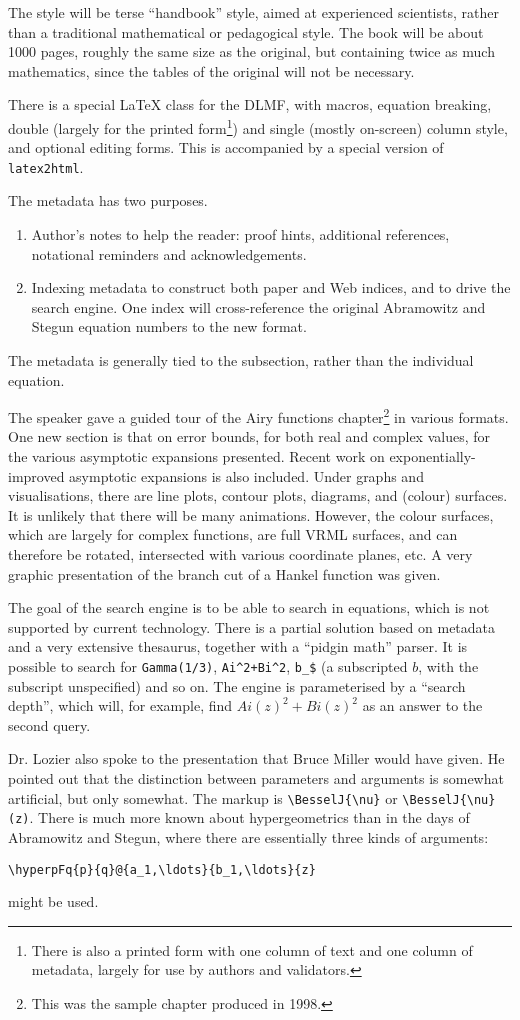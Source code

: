 \documentclass[11pt, a4paper]{article}
\begin{document}
The style will be terse ``handbook'' style, aimed at experienced scientists,
rather than a traditional mathematical or pedagogical style. The book will
be about 1000 pages, roughly the same size as the original, but containing
twice as much mathematics, since the tables of the original will not be
necessary.
\par
There is a special \LaTeX{} class for the DLMF, with macros, equation
breaking, double (largely for the printed form\footnote{There is also a
printed form with one column of text and one column of metadata, largely
for use by authors and validators.}) and single (mostly
on-screen) column style, and optional editing forms. This is accompanied by
a special version of \verb+latex2html+.
\par
The metadata has two purposes.
\begin{enumerate}
\item Author's notes to help the reader: proof hints, additional
references, notational reminders and acknowledgements.
\item Indexing metadata to construct both paper and Web indices, and to
drive the search engine. One index will cross-reference the original
Abramowitz and Stegun equation numbers to the new format.
\end{enumerate}
The metadata is generally tied to the subsection, rather than the
individual equation.
\par
The speaker gave a guided tour of the Airy functions chapter\footnote{This
was the sample chapter produced in 1998.} in various
formats.  One new section is that on error bounds, for both real and
complex values, for the various asymptotic expansions presented. Recent
work on exponentially-improved asymptotic expansions is also included.
Under graphs and visualisations, there are line plots, contour plots,
diagrams, and (colour) surfaces. It is unlikely that there will be many
animations. However, the colour surfaces, which are largely for complex
functions, are full VRML surfaces, and can therefore be rotated,
intersected with various coordinate planes, etc. A very graphic
presentation of the branch cut of a Hankel function was given.
\par
The goal of the search engine is to be able to search in equations, which
is not supported by current technology. There is a partial solution based
on metadata and a very extensive thesaurus, together with a ``pidgin
math'' parser.  It is possible to search for \verb+Gamma(1/3)+,
\verb=Ai^2+Bi^2=, \verb+b_$+ (a subscripted $b$, with the subscript
unspecified) and so on. The engine is parameterised by a ``search depth'',
which will, for example, find $Ai(z)^2+Bi(z)^2$ as an answer to the second
query.
\par
Dr. Lozier also spoke to the presentation that Bruce Miller would have
given. He pointed out that the distinction between parameters and arguments
is somewhat artificial, but only somewhat. The markup is
\verb+\BesselJ{\nu}+ or \verb+\BesselJ{\nu}(z)+. There is much more known
about hypergeometrics than in the days of Abramowitz and Stegun, where
there are essentially three kinds of arguments:
\begin{verbatim} 
\hyperpFq{p}{q}@{a_1,\ldots}{b_1,\ldots}{z}
\end{verbatim} 
might be used.
\end{document}

